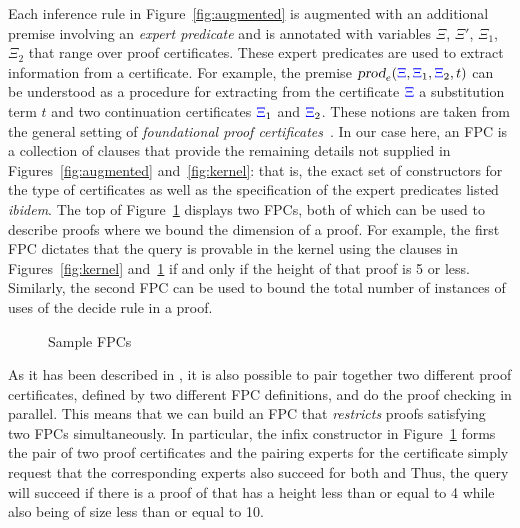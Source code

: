 Each inference rule in Figure~\ref{fig:augmented} is augmented with an
additional premise involving an \emph{expert predicate} and is
annotated with variables $\Xi$, $\Xi'$, $\Xi_1$, $\Xi_2$ that range
over proof certificates.  These expert predicates are used to extract
information from a certificate.  For example, the premise
$\hbox{\sl prod}_e({\color{blue}{\Xi}},{\color{blue}{\Xi}}_1,{\color{blue}{\Xi}}_2,t)$ can be understood as a procedure for
extracting from the certificate ${\color{blue}{\Xi}}$ a substitution term $t$ and two
continuation certificates ${\color{blue}{\Xi}}_1$ and ${\color{blue}{\Xi}}_2$.
%
These notions are taken from the general setting of \emph{foundational
  proof certificates}~\cite{chihani17jar}.
%
In our case here, an FPC is a collection of \lP clauses that provide
the remaining details not supplied in Figures~\ref{fig:augmented}
and~\ref{fig:kernel}: that is, the exact set of constructors for the
type of certificates  as well as the specification of the expert
predicates listed \emph{ibidem}.
%
The top of Figure~\ref{fig:resources} displays two FPCs,
both of which can be used to describe proofs where we bound
the dimension of  a proof.
%
For example, the first FPC dictates that the query \mbox{} is
provable in  the kernel using the clauses in Figures~\ref{fig:kernel}
and~\ref{fig:resources} if and only if the height of that proof is 5
or less.
%
Similarly, the second FPC can be used to bound the total number of instances of uses of the decide rule in a proof.
%

\begin{figure}[t]


\caption{Sample FPCs}
\label{fig:resources}
\end{figure}

As it has been described in \cite{blanco17cade}, it is also possible
to pair together two different proof certificates, defined by two
different FPC definitions, and do the proof checking in parallel.
This means that we can build an FPC that \emph{restricts} proofs
satisfying two FPCs simultaneously.  In particular, the infix
constructor  in Figure~\ref{fig:resources} forms the pair of
two proof certificates and the pairing experts for the certificate
 simply request that the corresponding experts
also succeed for both  and  Thus, the query
 will succeed if there is a
proof of  that has a height less than or equal to 4 while also
being of size less than or equal to 10.

